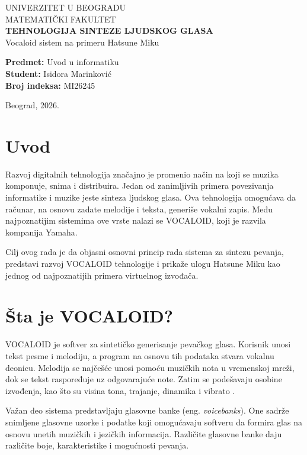 \documentclass[12pt,a4paper]{article}
\begin{document}
\begin{titlepage}
\centering
{\large UNIVERZITET U BEOGRADU}\\[0.3cm]
{\large MATEMATIČKI FAKULTET}\\[3.0cm]
{\LARGE\bfseries TEHNOLOGIJA SINTEZE LJUDSKOG GLASA}\\[0.4cm]
{\Large Vocaloid sistem na primeru Hatsune Miku}\\[3.0cm]
\begin{flushleft}
\textbf{Predmet:} Uvod u informatiku{\hspace{8cm}}\\[0.5cm]
\textbf{Student:} Isidora Marinković\\[0.5cm]
\textbf{Broj indeksa:} MI26245
\end{flushleft}
\vfill
{\large Beograd, 2026.}
\end{titlepage}

\tableofcontents
\newpage

\section{Uvod}
Razvoj digitalnih tehnologija značajno je promenio način na koji se muzika komponuje, snima i distribuira. Jedan od zanimljivih primera povezivanja informatike i muzike jeste sinteza ljudskog glasa. Ova tehnologija omogućava da računar, na osnovu zadate melodije i teksta, generiše vokalni zapis. Među najpoznatijim sistemima ove vrste nalazi se VOCALOID, koji je razvila kompanija Yamaha.

Cilj ovog rada je da objasni osnovni princip rada sistema za sintezu pevanja, predstavi razvoj VOCALOID tehnologije i prikaže ulogu Hatsune Miku kao jednog od najpoznatijih primera virtuelnog izvođača.

\section{Šta je VOCALOID?}
VOCALOID je softver za sintetičko generisanje pevačkog glasa. Korisnik unosi tekst pesme i melodiju, a program na osnovu tih podataka stvara vokalnu deonicu. Melodija se najčešće unosi pomoću muzičkih nota u vremenskoj mreži, dok se tekst raspoređuje uz odgovarajuće note. Zatim se podešavaju osobine izvođenja, kao što su visina tona, trajanje, dinamika i vibrato \cite{yamahaVOCALOID}.

Važan deo sistema predstavljaju glasovne banke (eng. \textit{voicebanks}). One sadrže snimljene glasovne uzorke i podatke koji omogućavaju softveru da formira glas na osnovu unetih muzičkih i jezičkih informacija. Različite glasovne banke daju različite boje, karakteristike i mogućnosti pevanja.
\end{document}
